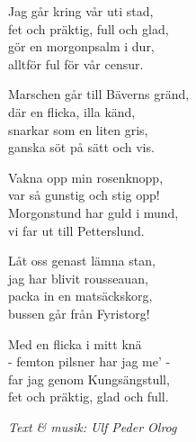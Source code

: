 \vspace{10pt}
Jag går kring vår uti stad,\\
fet och präktig, full och glad,\\
gör en morgonpsalm i dur,\\
alltför ful för vår censur.\par
\vspace{10pt}
Marschen går till Bäverns gränd,\\
där en flicka, illa känd,\\
snarkar som en liten gris,\\
ganska söt på sätt och vis.\par
\vspace{10pt}
Vakna opp min rosenknopp,\\
var så gunstig och stig opp!\\
Morgonstund har guld i mund,\\
vi far ut till Petterslund.\par
\vspace{10pt}
Låt oss genast lämna stan,\\
jag har blivit rousseauan,\\
packa in en matsäckskorg,\\
bussen går från Fyristorg!\par
\vspace{10pt}
Med en flicka i mitt knä\\
- femton pilsner har jag me’ -\\
far jag genom Kungsängstull,\\
fet och präktig, glad och full.\par
\vspace{10pt}
{\footnotesize\textit{Text \& musik: Ulf Peder Olrog}}
